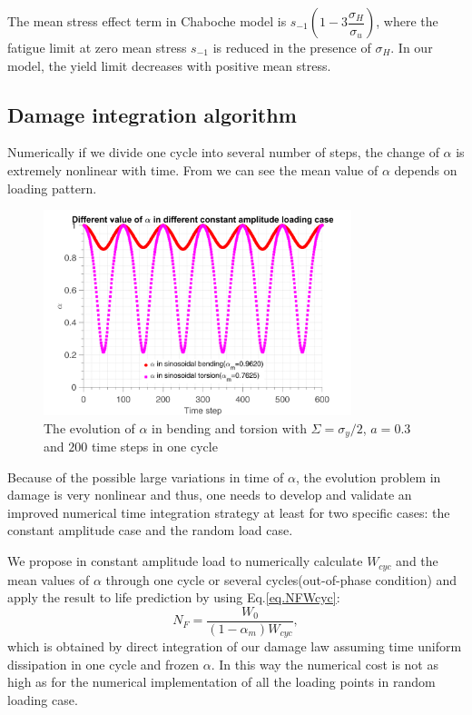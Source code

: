 The mean stress effect term in Chaboche model is $s_{-1}\left(1-3\dfrac{\sigma_H}{\sigma_u} \right)$, where the fatigue limit at zero mean stress $s_{-1}$ is reduced in the presence of $\sigma_H$. In our model, the yield limit decreases with positive mean stress. 


\subsection{Damage integration algorithm}

Numerically if we divide one cycle into several number of steps, the  change of $\alpha$ is extremely nonlinear with time. From  we can see the mean value of $\alpha$ depends on loading pattern. 

\begin{figure}[!h]
	\centering
	\includegraphics[width=0.8\textwidth]{figures//alp_mean_methods.png} 
	\caption{The evolution of $\alpha$ in bending and torsion with $\Sigma=\sigma_y/2$, $a=0.3$ and $200$ time steps in one cycle}
	\label{fig.alpmean}
\end{figure}


Because of the possible large variations in time  of $\alpha$, the evolution problem in damage is very nonlinear and thus, one needs to develop and validate an improved numerical time integration strategy at least  for two specific cases: the constant amplitude case and the random load case.

We propose in constant amplitude load to numerically calculate $W_{cyc}$ and the mean values of $\alpha$ through one cycle or several cycles(out-of-phase condition) and apply the result to life prediction by using  Eq.\eqref{eq.NFWcyc}:
\begin{equation}
N_F= \dfrac{W_0}{\left( 1-\alpha_m\right) W_{cyc}},
\label{eq.cycNF}
\end{equation}
which is obtained by direct integration of our damage law assuming time uniform dissipation in one cycle and frozen $\alpha$.
In this way the numerical cost is not as high as for the numerical implementation of all the loading points in random loading case.

